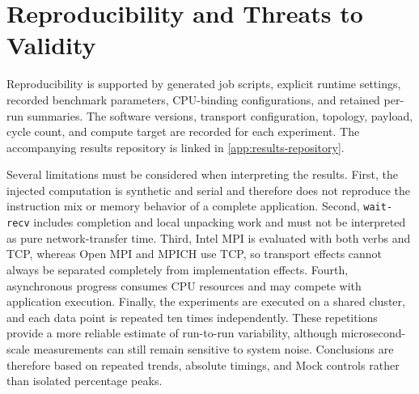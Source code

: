 \section{Reproducibility and Threats to Validity}

Reproducibility is supported by generated job scripts, explicit runtime
settings, recorded benchmark parameters, CPU-binding configurations, and
retained per-run summaries. The software versions, transport configuration,
topology, payload, cycle count, and compute target are recorded for each
experiment. The accompanying results repository is linked in
\autoref{app:results-repository}.

Several limitations must be considered when interpreting the results. First,
the injected computation is synthetic and serial and therefore does not
reproduce the instruction mix or memory behavior of a complete application.
Second, \texttt{wait-recv} includes completion and local unpacking work and
must not be interpreted as pure network-transfer time. Third, Intel MPI is
evaluated with both verbs and TCP, whereas Open MPI and MPICH use TCP, so
transport effects cannot always be separated completely from implementation
effects. Fourth, asynchronous progress consumes CPU resources and may compete
with application execution. Finally, the experiments are executed on a shared
cluster, and each data point is repeated ten times independently. These
repetitions provide a more reliable estimate of run-to-run variability,
although microsecond-scale measurements can still remain sensitive to system
noise. Conclusions are therefore based on repeated trends, absolute timings,
and Mock controls rather than isolated percentage peaks.
